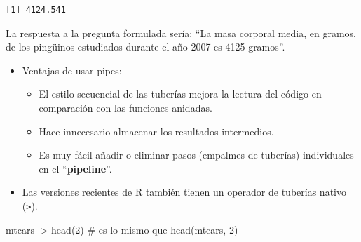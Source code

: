 \documentclass[
  letterpaper,
  DIV=11,
  numbers=noendperiod]{scrreprt}
\newenvironment{Shaded}{\begin{snugshade}}{\end{snugshade}}
\newcommand{\AttributeTok}[1]{\textcolor[rgb]{0.40,0.45,0.13}{#1}}
\newcommand{\CommentTok}[1]{\textcolor[rgb]{0.37,0.37,0.37}{#1}}
\newcommand{\DecValTok}[1]{\textcolor[rgb]{0.68,0.00,0.00}{#1}}
\newcommand{\FunctionTok}[1]{\textcolor[rgb]{0.28,0.35,0.67}{#1}}
\newcommand{\NormalTok}[1]{\textcolor[rgb]{0.00,0.23,0.31}{#1}}
\newcommand{\OtherTok}[1]{\textcolor[rgb]{0.00,0.23,0.31}{#1}}
\newcommand{\SpecialCharTok}[1]{\textcolor[rgb]{0.37,0.37,0.37}{#1}}
\begin{document}
\begin{Shaded}
\end{Shaded}

\begin{verbatim}
[1] 4124.541
\end{verbatim}

\begin{Shaded}
\end{Shaded}

La respuesta a la pregunta formulada sería: ``La masa corporal media, en
gramos, de los pingüinos estudiados durante el año 2007 es 4125
gramos''.

\begin{itemize}
\item
  Ventajas de usar pipes:

  \begin{itemize}
  \item
    El estilo secuencial de las tuberías mejora la lectura del código en
    comparación con las funciones anidadas.
  \item
    Hace innecesario almacenar los resultados intermedios.
  \item
    Es muy fácil añadir o eliminar pasos (empalmes de tuberías)
    individuales en el ``\textbf{pipeline}''.
  \end{itemize}
\item
  Las versiones recientes de R también tienen un operador de tuberías
  nativo (\texttt{\textbar{}\textgreater{}}).
\end{itemize}

\begin{Shaded}
\begin{Highlighting}[]
\NormalTok{mtcars }\SpecialCharTok{|\textgreater{}} \FunctionTok{head}\NormalTok{(}\DecValTok{2}\NormalTok{) }\CommentTok{\#  es lo mismo que  head(mtcars, 2)}
\end{Highlighting}
\end{Shaded}
\end{document}
